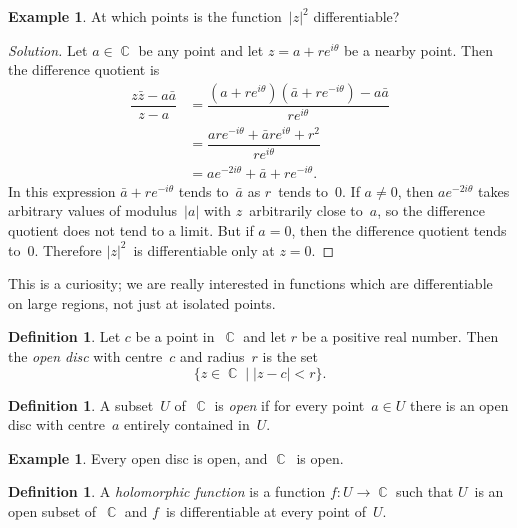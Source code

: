 \documentclass{amsproc}
\theoremstyle{definition}
\newtheorem{definition}[theorem]{Definition}
\newtheorem{example}[theorem]{Example}
\newenvironment{solution}{\begin{proof}[Solution]}{\end{proof}}
\theoremstyle{remark}
\DeclareMathOperator{\C}{\mathbb{C}}
\numberwithin{equation}{section}
\begin{document}
\begin{example} \label{CME1.4}
At which points is the function~$ |z|^2 $ differentiable?
\end{example}

\begin{solution}
Let $ a \in \C $ be any point and let $ z = a + re^{i\theta} $ be a nearby point. Then the difference quotient is
\begin{align*}
\dfrac{z\bar z - a\bar a}{z-a}
&= \dfrac{(a + re^{i\theta})(\bar{a} + re^{-i\theta}) - a\bar{a}}{re^{i\theta}} \\
&= \dfrac{are^{-i\theta} + \bar{a} re^{i\theta} + r^2}{re^{i\theta}} \\
&= ae^{-2i\theta} + \bar{a} + re^{-i\theta}.
\end{align*}
In this expression $\bar{a} + re^{-i\theta} $ tends to~$ \bar{a} $ as $ r $~tends to~$ 0 $. If $ a \neq 0 $, then $ ae^{-2i\theta} $ takes arbitrary values of modulus~$ |a| $
with $ z $~arbitrarily close to~$ a $, so the difference quotient does not tend to a limit. But if $ a = 0 $, then the difference quotient tends to~$ 0 $. Therefore $ |z|^2 $~is
differentiable only at $ z = 0 $.
\end{solution}

This is a curiosity; we are really interested in functions which are differentiable on large regions, not just at isolated points.

\begin{definition} \label{CMD1.5}
Let $ c $ be a point in~$ \C $ and let $ r $ be a positive real number. Then the \emph{open disc} with centre~$ c $ and radius~$ r $ is the set
$$
\{z \in \C \mid |z - c| < r \}.
$$
\end{definition}

\begin{definition} \label{CMD1.6}
A subset~$ U $ of~$ \C $ is \emph{open} if for every point~$ a \in U $  there is an open disc with centre~$ a $ entirely contained in~$ U $.
\end{definition}

\begin{example} \label{CME1.7}
Every open disc is open, and $ \C $~is open.
\end{example}

\begin{definition} \label{CMD1.8}
A \emph{holomorphic function} is a function $ f \colon U \to \C $ such that $ U $~is an open subset of~$ \C $ and $ f $~is differentiable at every point of~$ U $.
\end{definition}
\end{document}
